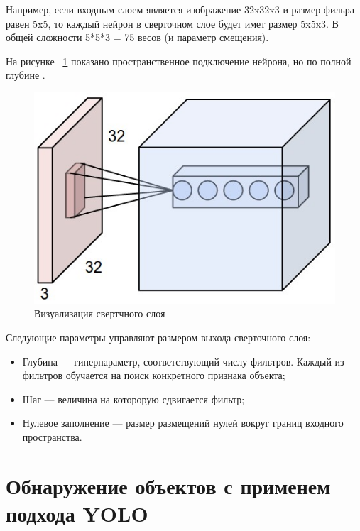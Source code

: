 \documentclass[a4paper,english,russian]{G2-105}
\begin{document}
\par Например, если входным слоем является изображение 32x32x3 и размер фильра равен 5x5, то каждый нейрон в сверточном слое будет имет размер 5x5x3. В общей сложности 5*5*3 = 75 весов (и параметр смещения). 
\par На рисунке ~\ref{depthcol} показано пространственное подключение нейрона, но по полной глубине \cite{16}. 
\begin{figure}
    \includegraphics[width=0.5\linewidth]{depthcol.png}
    \caption{Визуализация свертчного слоя}
	\label{depthcol}
\end{figure}
\par Следующие параметры управляют размером выхода сверточного слоя:
\begin{itemize}
\item Глубина --- гиперпараметр, соответствующий числу фильтров. Каждый из фильтров обучается на поиск конкретного признака объекта;
\item Шаг --- величина на которорую сдвигается фильтр;
\item Нулевое заполнение --- размер размещений нулей вокруг границ входного пространства.
\end{itemize}
\ttl
\section{Обнаружение объектов с применем подхода YOLO}
\end{document}
